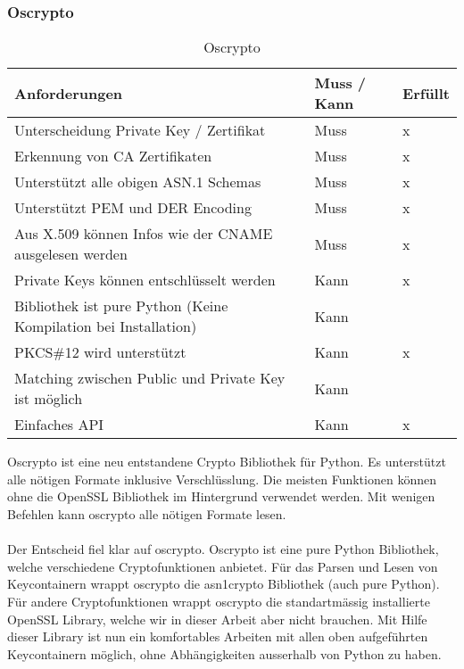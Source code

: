 \subsubsection{Oscrypto}
\begin{table}[H]
\centering
    \begin{tabular}{|p{12cm}|l|l|}
    \hline
    \rowcolor{lightblue}
    Anforderungen & Muss / Kann & Erfüllt   \\ \hline
	Unterscheidung Private Key / Zertifikat	&	Muss & x \\ \hline	
	Erkennung von CA Zertifikaten	&	Muss	& x \\ \hline	
	Unterstützt alle obigen ASN.1 Schemas	&	Muss	& x \\ \hline		
	Unterstützt PEM und DER Encoding	&	Muss	&  x \\ \hline	
	Aus X.509 können Infos wie der CNAME ausgelesen werden &	Muss	& x \\ \hline	
	Private Keys können entschlüsselt werden &	Kann &  x \\ \hline
	Bibliothek ist pure Python (Keine Kompilation bei Installation) &	Kann	&  ~ \\ \hline
	PKCS\#12 wird unterstützt &	Kann & x \\ \hline
	Matching zwischen Public und Private Key ist möglich &	Kann & ~  \\ \hline
	Einfaches API &	Kann & x \\ \hline
	\end{tabular}
    \caption[Oscrypto]{Oscrypto}
\end{table}
\medskip
Oscrypto ist eine neu entstandene Crypto Bibliothek für Python. Es unterstützt alle nötigen Formate inklusive Verschlüsslung. Die meisten Funktionen können ohne die OpenSSL Bibliothek im Hintergrund verwendet werden. Mit wenigen Befehlen kann oscrypto alle nötigen Formate lesen.\\\\

Der Entscheid fiel klar auf oscrypto. Oscrypto ist eine pure Python Bibliothek, welche verschiedene Cryptofunktionen anbietet. Für das Parsen und Lesen von Keycontainern wrappt oscrypto die asn1crypto Bibliothek (auch pure Python). Für andere Cryptofunktionen wrappt oscrypto die standartmässig installierte OpenSSL Library, welche wir in dieser Arbeit aber nicht brauchen.
Mit Hilfe dieser Library ist nun ein komfortables Arbeiten mit allen oben aufgeführten Keycontainern möglich, ohne Abhängigkeiten ausserhalb von Python zu haben.